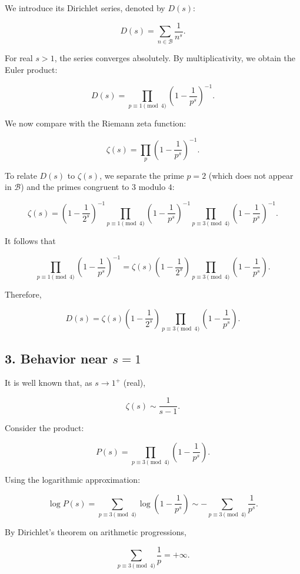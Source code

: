 \documentclass[12pt]{article}
\begin{document}
We introduce its Dirichlet series, denoted by \(D(s)\):

\[
D(s) = \sum_{n \in \mathcal{B}} \frac{1}{n^s}.
\]

For real \(s > 1\), the series converges absolutely. By multiplicativity, we obtain the Euler product:

\[
D(s) = \prod_{p \equiv 1 \pmod{4}} \left(1 - \frac{1}{p^s}\right)^{-1}.
\]

We now compare with the Riemann zeta function:

\[
\zeta(s) = \prod_{p} \left(1 - \frac{1}{p^s}\right)^{-1}.
\]

To relate \(D(s)\) to \(\zeta(s)\), we separate the prime \(p = 2\) (which does not appear in \(\mathcal{B}\)) and the primes congruent to \(3\) modulo \(4\):

\[
\zeta(s) = \left(1 - \frac{1}{2^s}\right)^{-1}
          \prod_{p \equiv 1 \pmod{4}} \left(1 - \frac{1}{p^s}\right)^{-1}
          \prod_{p \equiv 3 \pmod{4}} \left(1 - \frac{1}{p^s}\right)^{-1}.
\]

It follows that

\[
\prod_{p \equiv 1 \pmod{4}} \left(1 - \frac{1}{p^s}\right)^{-1}
= \zeta(s) \left(1 - \frac{1}{2^s}\right)
  \prod_{p \equiv 3 \pmod{4}} \left(1 - \frac{1}{p^s}\right).
\]

Therefore,

\[
D(s) = \zeta(s) \left(1 - \frac{1}{2^s}\right)
        \prod_{p \equiv 3 \pmod{4}} \left(1 - \frac{1}{p^s}\right).
\]

\subsection*{3. Behavior near \(s=1\)}

It is well known that, as \(s \to 1^+\) (real),

\[
\zeta(s) \sim \frac{1}{s-1}.
\]

Consider the product:

\[
P(s) = \prod_{p \equiv 3 \pmod{4}} \left(1 - \frac{1}{p^s}\right).
\]

Using the logarithmic approximation:

\[
\log P(s) = \sum_{p \equiv 3 \pmod{4}} \log\left(1 - \frac{1}{p^s}\right)
           \sim -\sum_{p \equiv 3 \pmod{4}} \frac{1}{p^s}.
\]

By Dirichlet's theorem on arithmetic progressions,

\[
\sum_{p \equiv 3 \pmod{4}} \frac{1}{p} = +\infty.
\]
\end{document}

